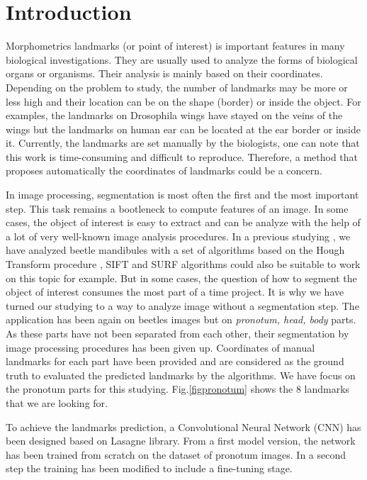 \documentclass[10pt]{article}
\begin{document}
\section{Introduction}
Morphometrics landmarks (or point of interest) is important features
in many biological investigations. They are  usually used to analyze
the forms of biological organs or organisms. Their analysis is mainly
based on their coordinates. Depending on the problem to study, the number of
landmarks may be more or less high and  their location  can
be on the shape (border) or inside the object. For
  examples, the landmarks on Drosophila wings \cite{drosophilaWings} have stayed on the
veins of the wings but the landmarks on human ear \cite{cintas2016automatic} can be located at
the ear border or inside it. Currently, the landmarks are set manually by
the biologists, one can note that this work is time-consuming and difficult to
reproduce. Therefore, a method that proposes automatically the
coordinates of landmarks could be a concern.

In image processing, segmentation is most often the first and the most
important step. This task remains a bootleneck to compute features of
an image. In some cases, the object of interest is easy to extract and
can be analyze with the help of a lot of very well-known image
analysis procedures. In a previous studying \cite{le2017maelab}, we have analyzed beetle
mandibules with a set of algorithms based on the Hough Transform
procedure \cite{palaniswamy2010automatic}, SIFT
\cite{lowe2004distinctive} and SURF \cite{bay2006surf} algorithms could also be
suitable to work on this topic for example. But in some cases, the question of how to segment the
object of interest consumes the most part of a time project. It is why
we have turned our studying to a way to analyze image without a
segmentation step. The application has been again on beetles images
but on \textit{pronotum, head, body} parts. As these parts have not
been separated from each other, their segmentation by image processing
procedures has been given up. Coordinates of manual landmarks for each part
have been provided and are considered as the ground
truth to evaluated the predicted landmarks by the algorithms. We have focus on the
pronotum parts for this studying. Fig.\ref{figpronotum} shows
the $8$ landmarks that we are looking for.


To achieve the landmarks prediction, a Convolutional Neural Network
(CNN)\cite{lecun2010convolutional} has been designed based on Lasagne
library\cite{lasagne}. From a first model version, the network has been
trained from scratch on the dataset of pronotum images. In a second
step the training has been modified to include a fine-tuning
\cite{yosinski2014transferable} stage.
\end{document}
